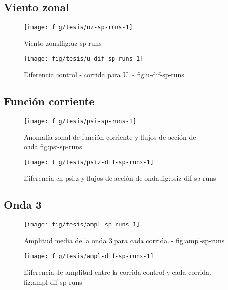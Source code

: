 \documentclass[spanish,a4paper]{book}
\begin{document}
\subsection{Viento zonal}\label{viento-zonal-2}

\begin{figure}

{\centering \texttt{[image: fig/tesis/uz-sp-runs-1]} 

}

\caption{Viento zonal{fig:uz-sp-runs}}\label{fig:uz-sp-runs}
\end{figure}

\begin{figure}
\texttt{[image: fig/tesis/u-dif-sp-runs-1]} \caption{Diferencia control - corrida para U. - fig:u-dif-sp-runs}\label{fig:u-dif-sp-runs}
\end{figure}

\subsection{Función corriente}\label{funcion-corriente-3}

\begin{figure}

{\centering \texttt{[image: fig/tesis/psi-sp-runs-1]} 

}

\caption{Anomalía zonal de función corriente y flujos de acción de onda.{fig:psi-sp-runs}}\label{fig:psi-sp-runs}
\end{figure}

\begin{figure}
\texttt{[image: fig/tesis/psiz-dif-sp-runs-1]} \caption{Diferencia en psi.z y flujos de acción de onda.{fig:psiz-dif-sp-runs}}\label{fig:psiz-dif-sp-runs}
\end{figure}

\subsection{Onda 3}\label{onda-3-2}

\begin{figure}
\texttt{[image: fig/tesis/ampl-sp-runs-1]} \caption{Amplitud media de la onda 3 para cada corrida. - fig:ampl-sp-runs}\label{fig:ampl-sp-runs}
\end{figure}

\begin{figure}
\texttt{[image: fig/tesis/ampl-dif-sp-runs-1]} \caption{Diferencia de amplitud entre la corrida control y cada corrida. - fig:ampl-dif-sp-runs}\label{fig:ampl-dif-sp-runs}
\end{figure}
\end{document}
